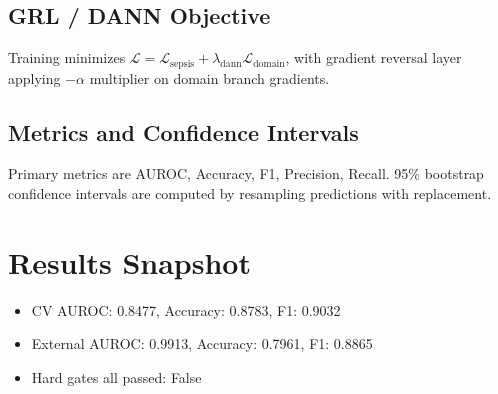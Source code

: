 \documentclass[11pt]{article}
\begin{document}
\subsection{GRL / DANN Objective}
Training minimizes $\mathcal{L} = \mathcal{L}_{\mathrm{sepsis}} + \lambda_{\mathrm{dann}}\mathcal{L}_{\mathrm{domain}}$, with gradient reversal layer applying $-\alpha$ multiplier on domain branch gradients.
\subsection{Metrics and Confidence Intervals}
Primary metrics are AUROC, Accuracy, F1, Precision, Recall. 95\% bootstrap confidence intervals are computed by resampling predictions with replacement.
\section{Results Snapshot}
\begin{itemize}
\item CV AUROC: 0.8477, Accuracy: 0.8783, F1: 0.9032
\item External AUROC: 0.9913, Accuracy: 0.7961, F1: 0.8865
\item Hard gates all passed: False
\end{itemize}
\end{document}
